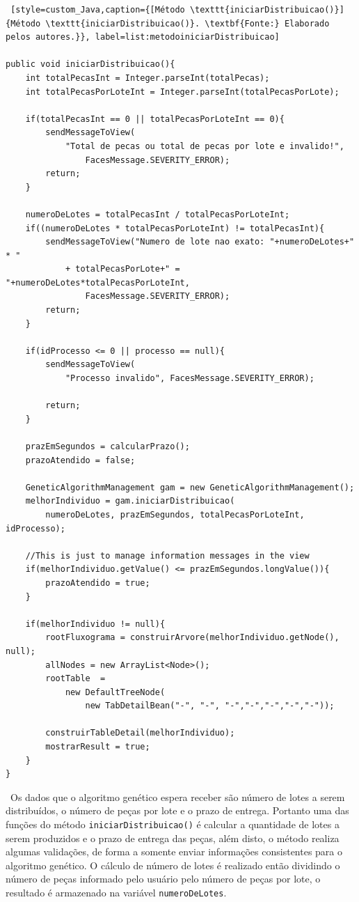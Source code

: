 \begin{lstlisting} [style=custom_Java,caption={[Método \texttt{iniciarDistribuicao()}]{Método \texttt{iniciarDistribuicao()}. \textbf{Fonte:} Elaborado pelos autores.}}, label=list:metodoiniciarDistribuicao] 

public void iniciarDistribuicao(){
	int totalPecasInt = Integer.parseInt(totalPecas);
	int totalPecasPorLoteInt = Integer.parseInt(totalPecasPorLote);
	
	if(totalPecasInt == 0 || totalPecasPorLoteInt == 0){
		sendMessageToView(
			"Total de pecas ou total de pecas por lote e invalido!", 
				FacesMessage.SEVERITY_ERROR);
		return;
	}
	
	numeroDeLotes = totalPecasInt / totalPecasPorLoteInt;
	if((numeroDeLotes * totalPecasPorLoteInt) != totalPecasInt){
		sendMessageToView("Numero de lote nao exato: "+numeroDeLotes+" * "
			+ totalPecasPorLote+" = "+numeroDeLotes*totalPecasPorLoteInt, 
				FacesMessage.SEVERITY_ERROR);
		return;
	}
	
	if(idProcesso <= 0 || processo == null){
		sendMessageToView(
			"Processo invalido", FacesMessage.SEVERITY_ERROR);
		
		return;
	}
	
	prazEmSegundos = calcularPrazo();
	prazoAtendido = false;
	
	GeneticAlgorithmManagement gam = new GeneticAlgorithmManagement();
	melhorIndividuo = gam.iniciarDistribuicao(
		numeroDeLotes, prazEmSegundos, totalPecasPorLoteInt, idProcesso);
	
	//This is just to manage information messages in the view
	if(melhorIndividuo.getValue() <= prazEmSegundos.longValue()){
		prazoAtendido = true;
	}
	
	if(melhorIndividuo != null){
		rootFluxograma = construirArvore(melhorIndividuo.getNode(), null);
		allNodes = new ArrayList<Node>();
		rootTable  = 
			new DefaultTreeNode(
				new TabDetailBean("-", "-", "-","-","-","-","-"));
	
		construirTableDetail(melhorIndividuo);
		mostrarResult = true;
	}
}

\end{lstlisting}

\ Os dados que o algoritmo genético espera receber são número de lotes a serem distribuídos, o número de 
peças por lote e o prazo de entrega. Portanto uma das funções do método \texttt{iniciarDistribuicao()} é
calcular a quantidade de lotes a serem produzidos e o prazo de entrega das peças, além disto, o método 
realiza algumas validações, de forma a somente enviar informações consistentes para o algoritmo genético. 
O cálculo de número de lotes é realizado então dividindo o número de peças informado pelo usuário pelo 
número de peças por lote, o resultado é armazenado na variável \texttt{numeroDeLotes}.

